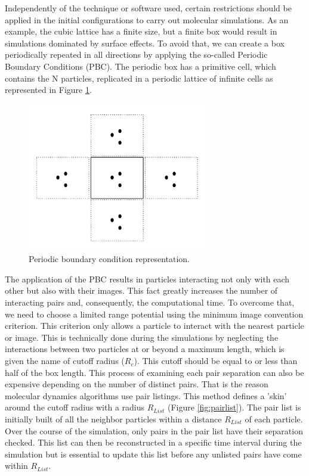 Independently of the technique or software used, certain restrictions should be applied in the initial configurations to carry out molecular simulations. As an example, the cubic lattice has a finite size, but a finite box would result in simulations dominated by surface effects. To avoid that, we can create a box periodically repeated in all directions by applying the so-called Periodic Boundary Conditions (PBC). The periodic box has a primitive cell, which contains the N particles, replicated in a periodic lattice of infinite cells as represented in Figure \ref{fig:pbc}. 

\begin{figure}
	\centering
	\includegraphics[width=0.7\textwidth]{Figures/pbc}
	\caption{Periodic boundary condition representation.}
	\label{fig:pbc}
\end{figure}

The application of the PBC results in particles interacting not only with each other but also with their images. This fact greatly increases the number of interacting pairs and, consequently, the computational time. To overcome that, we need to choose a limited range potential using the minimum image convention criterion. This criterion only allows a particle to interact with the nearest particle or image.  This is technically done during the simulations by neglecting the interactions between two particles at or beyond a maximum length, which is given the name of cutoff radius ($R_{c}$). This cutoff should be equal to or less than half of the box length. This process of examining each pair separation can also be expensive depending on the number of distinct pairs. That is the reason molecular dynamics algorithms use pair listings. This method defines a 'skin' around the cutoff radius with a radius $R_{List}$ (Figure \ref{fig:pairlist}). The pair list is initially built of all the neighbor particles within a distance $R_{List}$ of each particle. Over the course of the simulation, only pairs in the pair list have their separation checked. This list can then be reconstructed in a specific time interval during the simulation but is essential to update this list before any unlisted pairs have come within $R_{List}$.    

